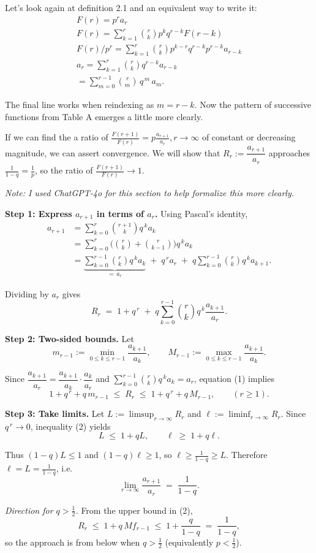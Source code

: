 \documentclass[11pt, oneside]{article} 	%
\begin{document}
Let's look again at definition 2.1 and an equivalent way to write it:\\

\begin{align}
F(r) = p^r a_r \\
F(r) = \sum_{k = 1}^r {r \choose k}p^kq^{r-k} F(r-k) \\
F(r) / p^r = \sum_{k = 1}^r {r \choose k}p^{k-r}q^{r-k} p^{r-k}a_{r-k} \\
a_r = \sum_{k = 1}^r {r \choose k}q^{r-k}a_{r-k} \\
= \sum_{m=0}^{r-1} \binom{r}{m}\,q^{\,m}\,a_{m}. 
\end{align}


The final line works when reindexing as $m  = r - k$.  Now the pattern of successive functions from Table A emerges a little more clearly.

If we can find the a ratio of  $\frac{F(r+1)}{F(r)} = p\frac{a_{r+1}}{a_r}, r \rightarrow \infty$ of constant or decreasing magnitude, we can assert convergence.   We will show that $R_r := \dfrac{a_{r+1}}{a_r}$ approaches $\frac1{1-q} = \frac1{p}$, so the ratio of $\frac{F(r+1)}{F(r)} \rightarrow 1$.
 
\textit{Note: I used ChatGPT-4o for this section to help formalize this more clearly.}

\textbf{Step 1: Express $a_{r+1}$ in terms of $a_r$.}  
Using Pascal's identity,
$$
\begin{aligned}
a_{r+1}
&= \sum_{k=0}^{r} \binom{r+1}{k} q^{\,k} a_k \\
&= \sum_{k=0}^{r} \Big(\binom{r}{k} + \binom{r}{k-1}\Big) q^{\,k} a_k \\
&= \underbrace{\sum_{k=0}^{r-1} \binom{r}{k} q^{\,k} a_k}_{=\,a_r}
\;+\; q^{\,r} a_r
\;+\; q \sum_{k=0}^{r-1} \binom{r}{k} q^{\,k} a_{k+1}.
\end{aligned}
$$

Dividing by $a_r$ gives
$$
R_r \;=\; 1 + q^{\,r} \;+\; q \sum_{k=0}^{r-1} \binom{r}{k} q^{\,k} \frac{a_{k+1}}{a_r}. 
$$

\textbf{Step 2: Two-sided bounds.}  
Let
$$
m_{r-1} := \min_{0 \le k \le r-1} \frac{a_{k+1}}{a_k}, 
\qquad 
M_{r-1} := \max_{0 \le k \le r-1} \frac{a_{k+1}}{a_k}.
$$

Since 
$\dfrac{a_{k+1}}{a_r} = \dfrac{a_{k+1}}{a_k} \cdot \dfrac{a_k}{a_r}$ 
and $\sum_{k=0}^{r-1} \binom{r}{k} q^{\,k} a_k = a_r$, 
equation (1) implies
$$
1 + q^{\,r} + q\,m_{r-1} \;\le\; R_r \;\le\; 1 + q^{\,r} + q\,M_{r-1}, 
\qquad (r \ge 1).
$$

\textbf{Step 3: Take limits.}  
Let $L := \limsup_{r\to\infty} R_r$ and $\ell := \liminf_{r\to\infty} R_r$.
Since $q^{\,r} \to 0$, inequality (2) yields
$$
L \;\le\; 1 + qL, 
\qquad 
\ell \;\ge\; 1 + q\ell.
$$

Thus $(1-q)L \le 1$ and $(1-q)\ell \ge 1$, so 
$\ell \ge \tfrac{1}{1-q} \ge L$. 
Therefore $\ell=L=\tfrac{1}{1-q}$, i.e.
$$
\lim_{r\to\infty} \frac{a_{r+1}}{a_r} \;=\; \frac{1}{1-q}.
$$

\textit{Direction for $q > \tfrac{1}{2}$.}  
From the upper bound in (2),
$$
R_r \;\le\; 1 + q\,Mf_{r-1} \;\le\; 1 + \frac{q}{1-q} \;=\; \frac{1}{1-q},
$$
so the approach is from below when $q>\tfrac{1}{2}$ (equivalently $p<\tfrac{1}{2}$).
\end{document}
